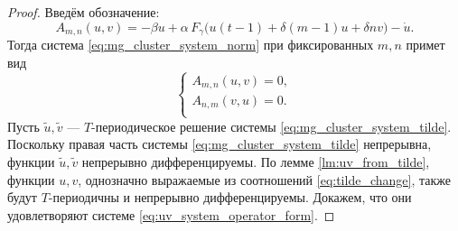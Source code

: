 \begin{proof}
	Введём обозначение:
	\begin{equation}
		\label{eq:operator_A_definition}
		A_{m, n}(u, v) = -\beta u + \alpha \, F_{\gamma}\big(u(t - 1) + \delta (m - 1)u + \delta n v \big) - \dot{u}.
	\end{equation}
	Тогда система \eqref{eq:mg_cluster_system_norm} при фиксированных $m, n$ примет вид
	\begin{equation}
		\label{eq:uv_system_operator_form}
		\begin{cases}
			A_{m, n}(u, v) = 0,\\
			A_{n, m}(v, u) = 0.\\
		\end{cases} 
	\end{equation}
	Пусть $\tilde{u}, \tilde{v}$ --- $T$-периодическое решение системы \eqref{eq:mg_cluster_system_tilde}. Поскольку правая часть системы \eqref{eq:mg_cluster_system_tilde} непрерывна, функции $\tilde{u}, \tilde{v}$ непрерывно дифференцируемы. По лемме \ref{lm:uv_from_tilde}, функции $u, v$, однозначно выражаемые из соотношений \eqref{eq:tilde_change}, также будут $T$-периодичны и непрерывно дифференцируемы. Докажем, что они удовлетворяют системе \eqref{eq:uv_system_operator_form}.
	

\end{proof}
